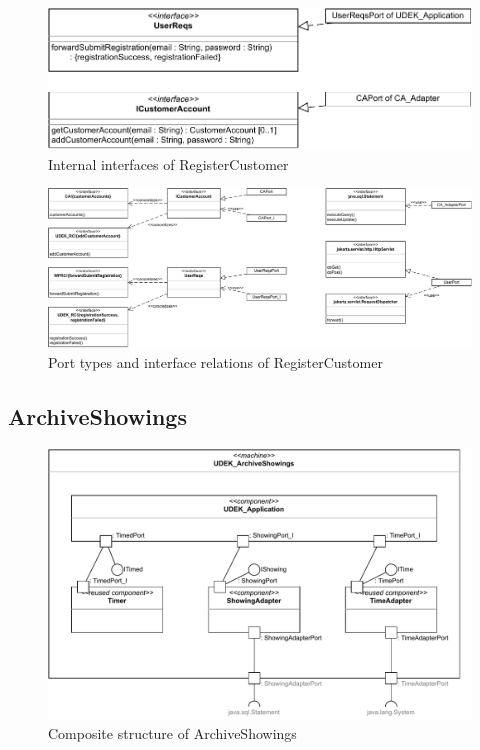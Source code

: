 \documentclass[a4paper,10pt,titlepage,bibtotoc,bibtotocnumbered]{scrreprt}
\begin{document}
\begin{figure}[H]
\centering
\includegraphics[width = \textwidth]{figures/08/A08_RegisterCustomer-Internal Interfaces.drawio.pdf}
\caption{Internal interfaces of RegisterCustomer}
\label{figure:RegisterCustomer_internal_interfaces}
\end{figure}

\begin{figure}[H]
\centering
\includegraphics[width = \textwidth]{figures/08/A08_RegisterCustomer-Port Types.drawio.pdf}
\caption{Port types and interface relations of RegisterCustomer}
\label{figure:RegisterCustomer_port_types}
\end{figure}

\subsection{ArchiveShowings}

\begin{figure}[H]
\centering
\includegraphics[width = \textwidth]{figures/08/A08_Archive-Composite Structure.drawio.pdf}
\caption{Composite structure of ArchiveShowings}
\label{figure:ArchiveShowings_composite_structure}
\end{figure}
\end{document}
